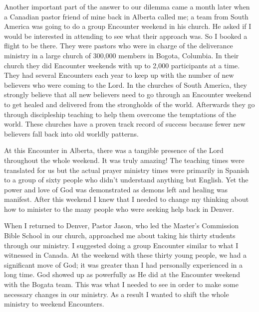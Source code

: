 \documentclass[twoside, 12pt]{book}
\begin{document}
Another important part of the answer to our dilemma came a month later when a Canadian pastor friend of mine back in Alberta called me; a team from South America was going to do a group Encounter weekend in his church. He asked if I would be interested in attending to see what their approach was. So I booked a flight to be there. They were pastors who were in charge of the deliverance ministry in a large church of 300,000 members in Bogota, Columbia. In their church they did Encounter weekends with up to 2,000 participants at a time. They had several Encounters each year to keep up with the number of new believers who were coming to the Lord. In the churches of South America, they strongly believe that all new believers need to go through an Encounter weekend to get healed and delivered from the strongholds of the world. Afterwards they go through discipleship teaching to help them overcome the temptations of the world. These churches have a proven track record of success because fewer new believers fall back into old worldly patterns. 

At this Encounter in Alberta, there was a tangible presence of the Lord throughout the whole weekend. It was truly amazing! The teaching times were translated for us but the actual prayer ministry times were primarily in Spanish to a group of sixty people who didn’t understand anything but English. Yet the power and love of God was demonstrated as demons left and healing was manifest. After this weekend I knew that I needed to change my thinking about how to minister to the many people who were seeking help back in Denver. 

When I returned to Denver, Pastor Jason, who led the Master’s Commission Bible School in our church, approached me about taking his thirty students through our ministry.  I suggested doing a group Encounter similar to what I witnessed in Canada. At the weekend with these thirty young people, we had a significant move of God; it was greater than I had personally experienced in a long time. God showed up as powerfully as He did at the Encounter weekend with the Bogata team. This was what I needed to see in order to make some necessary changes in our ministry. As a result I wanted to shift the whole ministry to weekend Encounters. 
\end{document}
